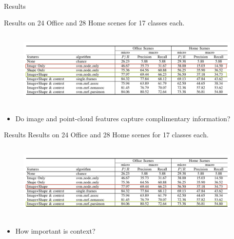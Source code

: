 \documentclass{beamer}
\begin{document}
\begin{frame}{Results }

Results on 24 Office and 28 Home scenes for 17 classes each.
\begin{figure}[t!]
\includegraphics[width=\linewidth,height=1.5in]{results_table1.png}
\end{figure}
{\small
\begin{itemize}
\item Do image and point-cloud features capture complimentary information? 
\end{itemize}
}
\end{frame}

\begin{frame}{Results } 
Results on 24 Office and 28 Home scenes for 17 classes each.
\begin{figure}[t!]
\includegraphics[width=\linewidth,height=1.5in]{results_table2.png}
\end{figure}
{\small
\begin{itemize}
\item How	important	is context?
\end{itemize}
}
\end{frame}
\end{document}
